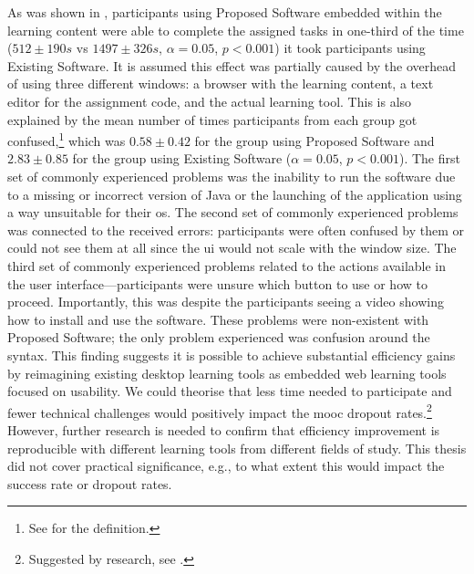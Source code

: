 As was shown in , participants using Proposed Software embedded within the learning content were able to complete the assigned tasks in one-third of the time ($512 \pm190 s$ vs $1497 \pm326 s$, $\alpha=0.05$, $p<0.001$) it took participants using Existing Software.
It is assumed this effect was partially caused by the overhead of using three different windows: a browser with the learning content, a text editor for the assignment code, and the actual learning tool.
This is also explained by the mean number of times participants from each group got confused,\footnote{See  for the definition.} which was $0.58 \pm 0.42$ for the group using Proposed Software and $2.83 \pm 0.85$ for the group using Existing Software ($\alpha=0.05$, $p<0.001$).
The first set of commonly experienced problems was the inability to run the software due to a missing or incorrect version of Java or the launching of the application using a way unsuitable for their \gls{os}.
The second set of commonly experienced problems was connected to the received errors: participants were often confused by them or could not see them at all since the \gls{ui} would not scale with the window size.
The third set of commonly experienced problems related to the actions available in the user interface---participants were unsure which button to use or how to proceed.
Importantly, this was despite the participants seeing a video showing how to install and use the software.
These problems were non-existent with Proposed Software; the only problem experienced was confusion around the syntax.
This finding suggests it is possible to achieve substantial efficiency gains by reimagining existing desktop learning tools as embedded web learning tools focused on usability.
We could theorise that less time needed to participate and fewer technical challenges would positively impact the \gls{mooc} dropout rates.\footnote{Suggested by research, see .}
However, further research is needed to confirm that efficiency improvement is reproducible with different learning tools from different fields of study.
This thesis did not cover practical significance, e.g., to what extent this would impact the success rate or dropout rates.

